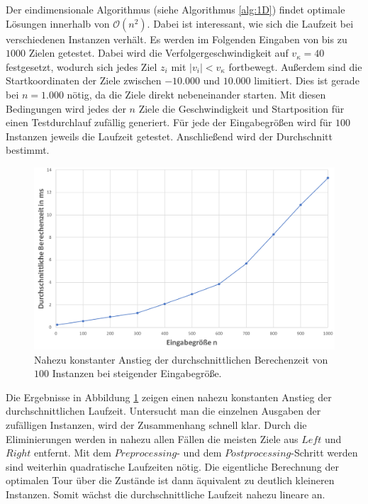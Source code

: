 \documentclass[german,version-2019-11]{uzl-thesis}
\begin{document}
Der eindimensionale Algorithmus (siehe Algorithmus \ref{alg:1D}) findet optimale Lösungen innerhalb von $\mathcal{O}(n^2)$. Dabei ist interessant, wie sich die Laufzeit bei verschiedenen Instanzen verhält. Es werden im Folgenden Eingaben von bis zu $1000$ Zielen getestet. Dabei wird die Verfolgergeschwindigkeit auf $v_\kappa=40$ festgesetzt, wodurch sich jedes Ziel $z_i$ mit $|v_i|<v_\kappa$ fortbewegt. Außerdem sind die Startkoordinaten der Ziele zwischen $-10.000$ und $10.000$ limitiert. Dies ist gerade bei $n=1.000$ nötig, da die Ziele direkt nebeneinander starten. Mit diesen Bedingungen wird jedes der $n$ Ziele die Geschwindigkeit und Startposition für einen Testdurchlauf zufällig generiert. Für jede der Eingabegrößen wird für $100$ Instanzen jeweils die Laufzeit getestet. Anschließend wird der Durchschnitt bestimmt. \\
\begin{figure}[htpb]
\centering
\includegraphics[scale=0.24]{../Grafiken/Verwendete/Exp1D_2.png}
\caption{Nahezu konstanter Anstieg der durchschnittlichen Berechenzeit von $100$ Instanzen bei steigender Eingabegröße.}
\label{fig:Exp1D}
\end{figure} 
Die Ergebnisse in Abbildung \ref{fig:Exp1D} zeigen einen nahezu konstanten Anstieg der durchschnittlichen Laufzeit. Untersucht man die einzelnen Ausgaben der zufälligen Instanzen, wird der Zusammenhang schnell klar. Durch die Eliminierungen werden in nahezu allen Fällen die meisten Ziele aus $Left$ und $Right$ entfernt. Mit dem $Preprocessing$- und dem $Postprocessing$-Schritt werden sind weiterhin quadratische Laufzeiten nötig. Die eigentliche Berechnung der optimalen Tour über die Zustände ist dann äquivalent zu deutlich kleineren Instanzen. Somit wächst die durchschnittliche Laufzeit nahezu lineare an. 
\end{document}
